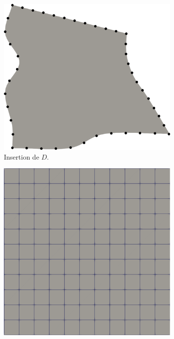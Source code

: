 \begin{figure}[h!]
\centering
\begin{subfigure}{0.5\textwidth}
    \includegraphics[width=\textwidth]{images/transfini_1.pdf}
    \caption{Insertion de $D$.}
    \label{fig:transfini_1}
\end{subfigure}
\hfill
\begin{subfigure}{0.4\textwidth}
    \includegraphics[width=\textwidth]{images/transfini_2.pdf}

\end{subfigure}
\end{figure}
